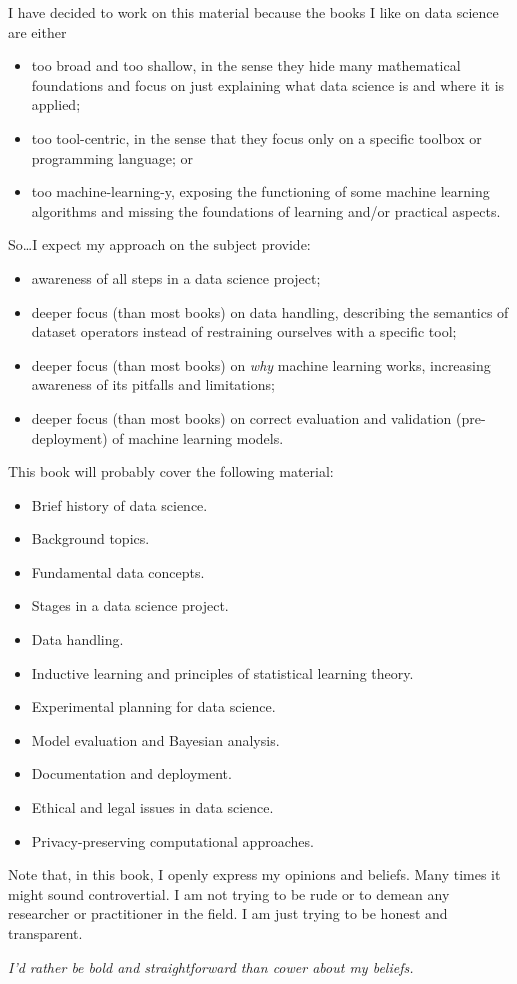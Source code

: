 I have decided to work on this material because the books I like on data science are
either
\begin{itemize}
  \item too broad and too shallow, in the sense they hide many mathematical foundations
    and focus on just explaining what data science is and where it is applied;
  \item too tool-centric, in the sense that they focus only on a specific toolbox or
    programming language; or
  \item too machine-learning-y, exposing the functioning of some machine learning
    algorithms and missing the foundations of learning and/or practical aspects.
\end{itemize}

So\dots I expect my approach on the subject provide:
\begin{itemize}
  \item awareness of all steps in a data science project;
  \item deeper focus (than most books) on data handling, describing the semantics of dataset
    operators instead of restraining ourselves with a specific tool;
  \item deeper focus (than most books) on \emph{why} machine learning works, increasing awareness of its pitfalls and
    limitations;
  \item deeper focus (than most books) on correct evaluation and validation
    (pre-deployment) of machine learning models.
\end{itemize}

This book will probably cover the following material:
\begin{itemize}
  \item Brief history of data science.
  \item Background topics.
  \item Fundamental data concepts.
  \item Stages in a data science project.
  \item Data handling.
  \item Inductive learning and principles of statistical learning theory.
  \item Experimental planning for data science.
  \item Model evaluation and Bayesian analysis.
  \item Documentation and deployment.
  \item Ethical and legal issues in data science.
  \item Privacy-preserving computational approaches.
\end{itemize}

Note that, in this book, I openly express my opinions and beliefs. Many times it might sound
controvertial.  I am not trying to be rude or to demean any researcher or practitioner in the
field.  I am just trying to be honest and transparent.

\emph{I'd rather be bold and straightforward than cower about my beliefs.}
